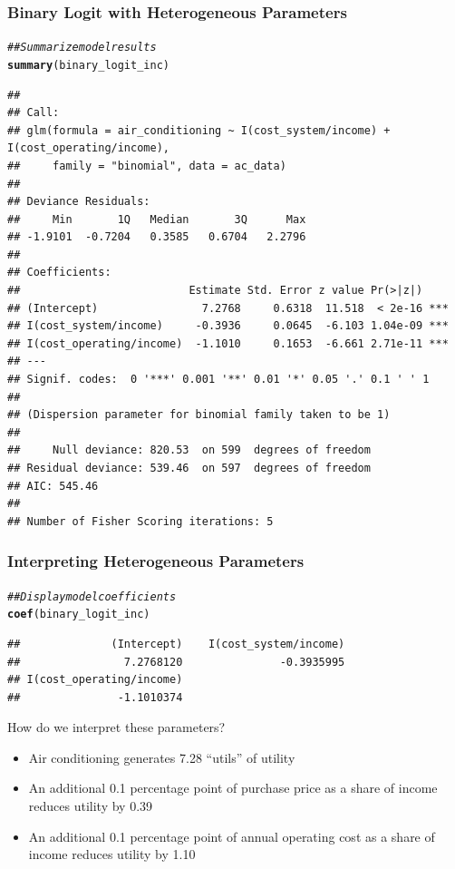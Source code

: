 \documentclass{beamer}\usepackage[]{graphicx}\usepackage[]{xcolor}
\makeatletter
\newcommand{\hlcom}[1]{\textcolor[rgb]{0.678,0.584,0.686}{\textit{#1}}}%
\newcommand{\hlstd}[1]{\textcolor[rgb]{0.345,0.345,0.345}{#1}}%
\newcommand{\hlkwd}[1]{\textcolor[rgb]{0.737,0.353,0.396}{\textbf{#1}}}%
\newenvironment{kframe}{%
 \def\at@end@of@kframe{}%
 \ifinner\ifhmode%
  \def\at@end@of@kframe{\end{minipage}}%
  \begin{minipage}{\columnwidth}%
 \fi\fi%
 \def\FrameCommand##1{\hskip\@totalleftmargin \hskip-\fboxsep
 \colorbox{shadecolor}{##1}\hskip-\fboxsep
     \hskip-\linewidth \hskip-\@totalleftmargin \hskip\columnwidth}%
 \MakeFramed {\advance\hsize-\width
   \@totalleftmargin\z@ \linewidth\hsize
   \@setminipage}}%
 {\par\unskip\endMakeFramed%
 \at@end@of@kframe}
\newenvironment{knitrout}{}{} %
\makeatother
\begin{document}
\begin{frame}[fragile]\frametitle{Binary Logit with Heterogeneous Parameters}
\begin{knitrout}\tiny
{}\color{fgcolor}\begin{kframe}
\begin{alltt}
\hlcom{## Summarize model results}
\hlkwd{summary}\hlstd{(binary_logit_inc)}
\end{alltt}
\begin{verbatim}
## 
## Call:
## glm(formula = air_conditioning ~ I(cost_system/income) + I(cost_operating/income), 
##     family = "binomial", data = ac_data)
## 
## Deviance Residuals: 
##     Min       1Q   Median       3Q      Max  
## -1.9101  -0.7204   0.3585   0.6704   2.2796  
## 
## Coefficients:
##                          Estimate Std. Error z value Pr(>|z|)    
## (Intercept)                7.2768     0.6318  11.518  < 2e-16 ***
## I(cost_system/income)     -0.3936     0.0645  -6.103 1.04e-09 ***
## I(cost_operating/income)  -1.1010     0.1653  -6.661 2.71e-11 ***
## ---
## Signif. codes:  0 '***' 0.001 '**' 0.01 '*' 0.05 '.' 0.1 ' ' 1
## 
## (Dispersion parameter for binomial family taken to be 1)
## 
##     Null deviance: 820.53  on 599  degrees of freedom
## Residual deviance: 539.46  on 597  degrees of freedom
## AIC: 545.46
## 
## Number of Fisher Scoring iterations: 5
\end{verbatim}
\end{kframe}
\end{knitrout}
\end{frame}

\begin{frame}[fragile]\frametitle{Interpreting Heterogeneous Parameters}
\begin{knitrout}\footnotesize
{}\color{fgcolor}\begin{kframe}
\begin{alltt}
\hlcom{## Display model coefficients}
\hlkwd{coef}\hlstd{(binary_logit_inc)}
\end{alltt}
\begin{verbatim}
##              (Intercept)    I(cost_system/income) 
##                7.2768120               -0.3935995 
## I(cost_operating/income) 
##               -1.1010374
\end{verbatim}
\end{kframe}
\end{knitrout}
    \vspace{2ex}
    How do we interpret these parameters?
    \begin{itemize}
        \item Air conditioning generates 7.28 ``utils'' of utility
        \item An additional 0.1 percentage point of purchase price as a share of income reduces utility by 0.39
        \item An additional 0.1 percentage point of annual operating cost as a share of income reduces utility by 1.10
    \end{itemize}
\end{frame}
\end{document}
